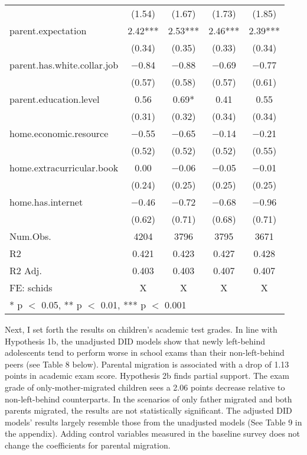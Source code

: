 \documentclass[
  man]{apa7}
\begin{document}
\begin{table}
\begin{tabular}[t]{lcccc}
 & (\num{1.54}) & (\num{1.67}) & (\num{1.73}) & (\num{1.85})\\
parent.expectation & \num{2.42}*** & \num{2.53}*** & \num{2.46}*** & \num{2.39}***\\
 & (\num{0.34}) & (\num{0.35}) & (\num{0.33}) & (\num{0.34})\\
parent.has.white.collar.job & \num{-0.84} & \num{-0.88} & \num{-0.69} & \num{-0.77}\\
 & (\num{0.57}) & (\num{0.58}) & (\num{0.57}) & (\num{0.61})\\
parent.education.level & \num{0.56} & \num{0.69}* & \num{0.41} & \num{0.55}\\
 & (\num{0.31}) & (\num{0.32}) & (\num{0.34}) & (\num{0.34})\\
home.economic.resource & \num{-0.55} & \num{-0.65} & \num{-0.14} & \num{-0.21}\\
 & (\num{0.52}) & (\num{0.52}) & (\num{0.52}) & (\num{0.55})\\
home.extracurricular.book & \num{0.00} & \num{-0.06} & \num{-0.05} & \num{-0.01}\\
 & (\num{0.24}) & (\num{0.25}) & (\num{0.25}) & (\num{0.25})\\
home.has.internet & \num{-0.46} & \num{-0.72} & \num{-0.68} & \num{-0.96}\\
 & (\num{0.62}) & (\num{0.71}) & (\num{0.68}) & (\num{0.71})\\
\midrule
Num.Obs. & \num{4204} & \num{3796} & \num{3795} & \num{3671}\\
R2 & \num{0.421} & \num{0.423} & \num{0.427} & \num{0.428}\\
R2 Adj. & \num{0.403} & \num{0.403} & \num{0.407} & \num{0.407}\\
FE: schids & X & X & X & X\\
\bottomrule
\multicolumn{5}{l}{\rule{0pt}{1em}* p $<$ 0.05, ** p $<$ 0.01, *** p $<$ 0.001}\\
\end{tabular}
\end{table}

Next, I set forth the results on children's academic test grades. In line with Hypothesis 1b, the unadjusted DID models show that newly left-behind adolescents tend to perform worse in school exams than their non-left-behind peers (see Table 8 below). Parental migration is associated with a drop of 1.13 points in academic exam score. Hypothesis 2b finds partial support. The exam grade of only-mother-migrated children sees a 2.06 points decrease relative to non-left-behind counterparts. In the scenarios of only father migrated and both parents migrated, the results are not statistically significant. The adjusted DID models' results largely resemble those from the unadjusted models (See Table 9 in the appendix). Adding control variables measured in the baseline survey does not change the coefficients for parental migration.
\end{document}
